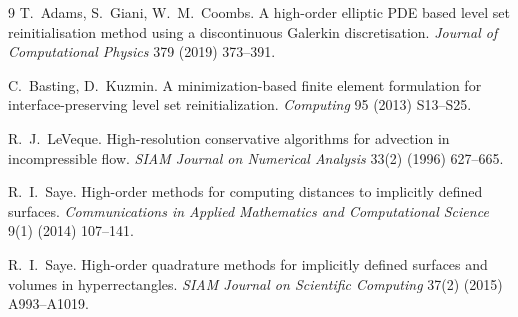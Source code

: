 \documentclass[11pt,a4paper]{article}
\begin{document}
\begin{thebibliography}{9}
T.~Adams, S.~Giani, W.~M.~Coombs.
A high-order elliptic PDE based level set reinitialisation method using a discontinuous Galerkin
discretisation.
\emph{Journal of Computational Physics} 379 (2019) 373--391.

C.~Basting, D.~Kuzmin.
A minimization-based finite element formulation for interface-preserving level set
reinitialization.
\emph{Computing} 95 (2013) S13--S25.

R.~J.~LeVeque.
High-resolution conservative algorithms for advection in incompressible flow.
\emph{SIAM Journal on Numerical Analysis} 33(2) (1996) 627--665.

R.~I.~Saye.
High-order methods for computing distances to implicitly defined surfaces.
\emph{Communications in Applied Mathematics and Computational Science} 9(1) (2014) 107--141.

R.~I.~Saye.
High-order quadrature methods for implicitly defined surfaces and volumes in hyperrectangles.
\emph{SIAM Journal on Scientific Computing} 37(2) (2015) A993--A1019.
\end{thebibliography}
\end{document}
